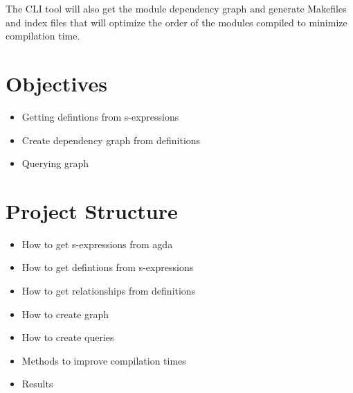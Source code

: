 The CLI tool will also get the module dependency graph and generate Makefiles
and index files that will optimize the order of the modules compiled to
minimize compilation time.

\section{Objectives}

\begin{itemize}
    \item Getting defintions from s-expressions 
    \item Create dependency graph from definitions 
    \item Querying graph
\end{itemize}

\section{Project Structure}

\begin{itemize}
\item How to get s-expressions from agda 
\item How to get defintions from s-expressions 
\item How to get relationships from definitions 
\item How to create graph 
\item How to create queries 
\item Methods to improve compilation times 
\item Results
\end{itemize}




%
